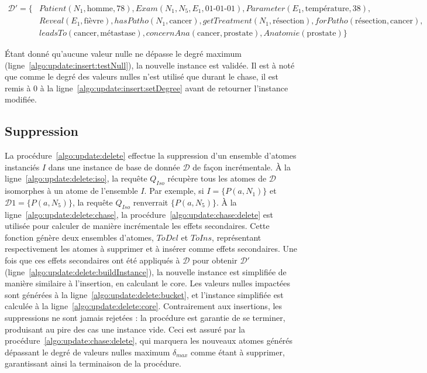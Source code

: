\begin{example}
    \begin{align*}
        \mathcal{D}' = \{ & Patient(N_1, \text{homme}, 78), Exam(N_1, N_5, E_1, \text{01-01-01}), Parameter(E_1, \text{température}, 38),                             \\
                          & Reveal(E_1, \text{fièvre}), hasPatho(N_1, \text{cancer}), getTreatment(N_1, \text{résection}), forPatho(\text{résection}, \text{cancer}), \\
                          & leadsTo(\text{cancer}, \text{métastase}), concernAna(\text{cancer}, \text{prostate}), Anatomie(\text{prostate}) \}
    \end{align*}

    Étant donné qu'aucune valeur nulle ne dépasse le degré maximum (ligne~\ref{algo:update:insert:testNull}), la nouvelle instance est validée.
    Il est à noté que comme le degré des valeurs nulles n'est utilisé que durant le \gls{chase}, il est remis à $0$ à la ligne~\ref{algo:update:insert:setDegree} avant de retourner l'instance modifiée.
\end{example}

\subsection{Suppression}
\label{sec:update:delete}
La procédure~\ref{algo:update:delete} effectue la suppression d'un ensemble d'atomes instanciés $I$ dans une instance de base de donnée $\mathcal{D}$ de façon incrémentale.
À la ligne~\ref{algo:update:delete:iso}, la requête $Q_{Iso}$ récupère tous les atomes de $\mathcal{D}$ isomorphes à un atome de l'ensemble $I$.
Par exemple, si $I = \{P(a, N_1)\}$ et $\mathcal{D}1= \{P(a, N_5)\}$, la requête $Q_{Iso}$ renverrait $\{P(a, N_5)\}$.
À la ligne~\ref{algo:update:delete:chase}, la procédure~\ref{algo:update:chase:delete} est utilisée pour calculer de manière incrémentale les effets secondaires.
Cette fonction génère deux ensembles d'atomes, $ToDel$ et $ToIns$, représentant respectivement les atomes à supprimer et à insérer comme effets secondaires.
Une fois que ces effets secondaires ont été appliqués à $\mathcal{D}$ pour obtenir $\mathcal{D}'$ (ligne~\ref{algo:update:delete:buildInstance}), la nouvelle instance est simplifiée de manière similaire à l'insertion, en calculant le \gls{core}.
Les valeurs nulles impactées sont générées à la ligne~\ref{algo:update:delete:bucket}, et l'instance simplifiée est calculée à la ligne~\ref{algo:update:delete:core}.
Contrairement aux insertions, les suppressions ne sont jamais rejetées : la procédure est garantie de se terminer, produisant au pire des cas une instance vide.
Ceci est assuré par la procédure~\ref{algo:update:chase:delete}, qui marquera les nouveaux atomes générés dépassant le degré de valeurs nulles maximum $\delta_{max}$ comme étant à supprimer, garantissant ainsi la terminaison de la procédure.

